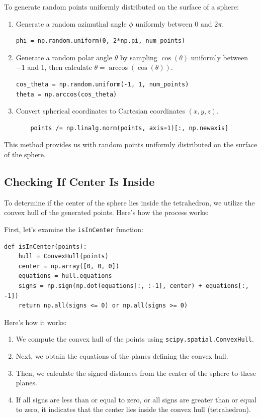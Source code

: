 \documentclass{article}
\begin{document}
To generate random points uniformly distributed on the surface of a sphere:
\begin{enumerate}
  \item Generate a random azimuthal angle \( \phi \) uniformly between \( 0 \) and \( 2\pi \).
\begin{verbatim}
phi = np.random.uniform(0, 2*np.pi, num_points)
\end{verbatim}

    
 \item Generate a random polar angle \( \theta \) by sampling \( \cos(\theta) \) uniformly between \( -1 \) and \( 1 \), then calculate \( \theta = \arccos(\cos(\theta)) \).
\begin{verbatim}
cos_theta = np.random.uniform(-1, 1, num_points)
theta = np.arccos(cos_theta)
\end{verbatim}

    
    \item Convert spherical coordinates to Cartesian coordinates \( (x, y, z) \).
    \begin{verbatim}
    points /= np.linalg.norm(points, axis=1)[:, np.newaxis]
    \end{verbatim}

\end{enumerate}

This method provides us with random points uniformly distributed on the surface of the sphere.



\subsection{Checking If Center Is Inside}

To determine if the center of the sphere lies inside the tetrahedron, we utilize the convex hull of the generated points. Here's how the process works:

First, let's examine the \texttt{isInCenter} function:

\begin{verbatim}
def isInCenter(points):
    hull = ConvexHull(points)
    center = np.array([0, 0, 0])
    equations = hull.equations
    signs = np.sign(np.dot(equations[:, :-1], center) + equations[:, -1])
    return np.all(signs <= 0) or np.all(signs >= 0)
\end{verbatim}

Here's how it works:
\begin{enumerate}
    \item We compute the convex hull of the points using \texttt{scipy.spatial.ConvexHull}.
    \item Next, we obtain the equations of the planes defining the convex hull.
    \item Then, we calculate the signed distances from the center of the sphere to these planes.
    \item If all signs are less than or equal to zero, or all signs are greater than or equal to zero, it indicates that the center lies inside the convex hull (tetrahedron).
\end{enumerate}
\end{document}
